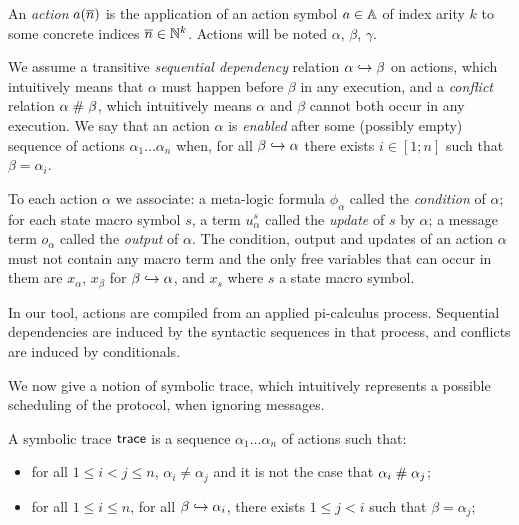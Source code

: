 \begin{definition}
  An \emph{action} $a(\overline{n})$ is the application of
  an action symbol $a\in\mathbb{A}$ of index arity $k$ to
  some concrete indices $\overline{n}\in\mathbb{N}^k$.
  Actions will be noted $\alpha$, $\beta$, $\gamma$.

  We assume a transitive \emph{sequential dependency} relation
  $\alpha\hookrightarrow\beta$ on actions, which intuitively means that
  $\alpha$ must happen before $\beta$ in any execution,
  and a \emph{conflict} relation $\alpha\mathrel{\#}\beta$, 
  which intuitively means $\alpha$ and $\beta$ cannot both occur in
  any execution.
  We say that an action $\alpha$ is \emph{enabled} after some (possibly empty)
  sequence of actions $\alpha_1\ldots\alpha_n$ when, for all 
  $\beta\hookrightarrow\alpha$ there exists $i\in[1;n]$ such that $\beta=\alpha_i$.

  To each action $\alpha$ we associate:
  a meta-logic formula $\phi_\alpha$ called the \emph{condition}
  of $\alpha$;
  for each state macro symbol $s$, a term $u^s_\alpha$ called
  the \emph{update} of $s$ by $\alpha$;
  a message term $o_\alpha$ called the \emph{output} of $\alpha$.
  The condition, output and updates of an action $\alpha$ must not contain any
  macro term and the only free variables that can occur in them are
  $x_\alpha$, $x_\beta$ for $\beta\hookrightarrow\alpha$, and $x_s$ where $s$ a
  state macro symbol.
\end{definition}

In our tool, actions are compiled from an applied pi-calculus process.
Sequential dependencies are induced by the syntactic sequences in that 
process, and conflicts are induced by conditionals.

\medskip

We now give a notion of symbolic trace, which intuitively represents
a possible scheduling of the protocol, when ignoring messages.

\begin{definition} \label{def:trace}
  A symbolic trace $\textsf{trace}$ is a sequence $\alpha_1\ldots\alpha_n$ of actions
  such that:
  \begin{itemize}
    \item for all $1 \leq i < j \leq n$,
      $\alpha_i \neq \alpha_j$ and it is not the case
      that $\alpha_i \mathrel{\#} \alpha_j$;
    \item for all $1 \leq i \leq n$,
      for all $\beta \hookrightarrow \alpha_i$,
      there exists $1 \leq j < i$ such that $\beta = \alpha_j$;
  \end{itemize}
\end{definition}

